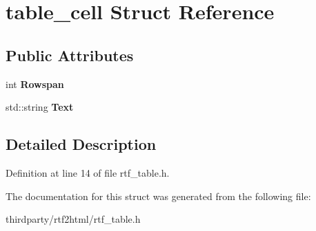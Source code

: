 \hypertarget{structtable__cell}{}\section{table\+\_\+cell Struct Reference}
\label{structtable__cell}
\subsection*{Public Attributes}
\begin{DoxyCompactItemize}
\item 
\mbox{\label{structtable__cell_a8fae983906e08b1ebd228b4129358464}} 
int {\bfseries Rowspan}
\item 
\mbox{\label{structtable__cell_a6d751efdbc51b64cb23c967cba076919}} 
std\+::string {\bfseries Text}
\end{DoxyCompactItemize}


\subsection{Detailed Description}


Definition at line 14 of file rtf\+\_\+table.\+h.



The documentation for this struct was generated from the following file\+:\begin{DoxyCompactItemize}
\item 
thirdparty/rtf2html/rtf\+\_\+table.\+h\end{DoxyCompactItemize}
